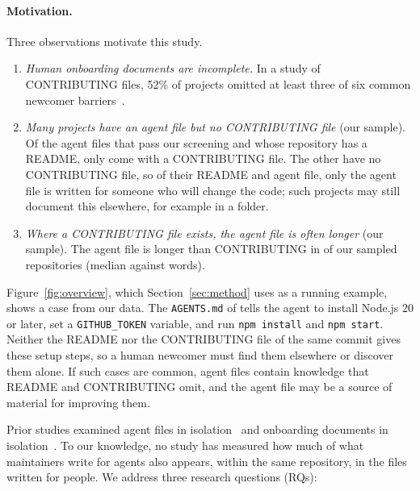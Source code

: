 \documentclass[sigconf,nonacm]{acmart}
\begin{document}
\paragraph{Motivation.} Three observations motivate this study.
\begin{enumerate}
\item \emph{Human onboarding documents are incomplete.} In a study of CONTRIBUTING files, 52\% of
projects omitted at least three of six common newcomer barriers~\cite{fronchetti2023contributing}.
\item \emph{Many projects have an agent file but no CONTRIBUTING file} (our sample). Of the
\nWithReadme{} agent files that pass our screening and whose repository has a README, only
\withContributingShare{} come with a CONTRIBUTING file. The other \withoutContributingShare{} have
no CONTRIBUTING file, so of their README and agent file, only the agent file is written for someone
who will change the code; such projects may still document this elsewhere, for example in a
 folder.
\item \emph{Where a CONTRIBUTING file exists, the agent file is often longer} (our sample). The
agent file is longer than CONTRIBUTING in \agentLongerShare{} of our sampled repositories (median
\agentWords{} against \contribWords{} words).
\end{enumerate}

Figure~\ref{fig:overview}, which Section~\ref{sec:method} uses as a running example, shows a case
from our data. The \texttt{AGENTS.md} of  tells the
agent to install Node.js 20 or later, set a \texttt{GITHUB\_TOKEN} variable, and run
\texttt{npm install} and \texttt{npm start}. Neither the README nor the CONTRIBUTING file of the
same commit gives these setup steps, so a human newcomer must find them elsewhere or discover them
alone. If such cases are common, agent files contain knowledge that README and CONTRIBUTING omit,
and the agent file may be a source of material for improving them.



Prior studies examined agent files in
isolation~\cite{chatlatanagulchai2026agentreadmes,mohsenimofidi2026context,gloaguen2026agentsmd}
and onboarding documents in isolation~\cite{prana2019readme,fronchetti2023contributing}. To our
knowledge, no study has measured how much of what maintainers write for agents also appears, within
the same repository, in the files written for people. We address three research questions (RQs):
\end{document}
